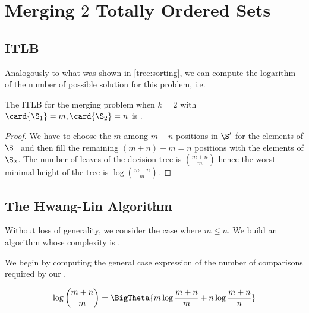 \section{Merging \(2\) Totally Ordered Sets}
\label{tree:merging:k=2}

\subsection*{ITLB}
\label{tree:merging:k=2:ITLB}

Analogously to what was shown in \ref{tree:sorting}, we can compute the
logarithm of the number of possible solution for this problem, i.e.

\begin{theorem}
The ITLB for the merging problem when \(k = 2\) with \(\card{\S_1} = m, \card{\S_2}
= n\) is .
\end{theorem}

\begin{proof}
We have to choose the $m$ among $m+n$ positions in $\S'$ for the elements of
$\S_1$ and then fill the remaining $(m+n) - m = n$ positions with the elements
of $\S_2$. The number of leaves of the decision tree is $\binom{m+n}{m}$ hence
the worst minimal height of the tree is $\log \binom{m+n}{m}$.
\end{proof}



\subsection*{The Hwang-Lin Algorithm}
\label{tree:merging:k=2:alg}

Without loss of generality, we consider the case where \(m \leq n\). We build an
algorithm whose complexity is .

We begin by computing the general case expression of the number of comparisons
required by our .

\begin{lemma}
\begin{align*}
\log\binom{m+n}{m} &= \BigTheta{m \log\frac{m+n}{m} + n \log\frac{m+n}{n}}\\
\end{align*}
\end{lemma}

